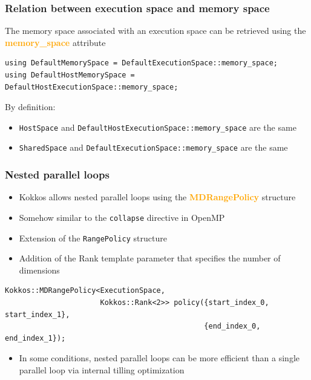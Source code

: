 \documentclass[aspectratio=169]{beamer}
\newcommand{\highlight}[1]{\textcolor{orange}{\textbf{#1}}}
\begin{document}
\begin{frame}[fragile]
    \frametitle{Relation between execution space and memory space}


The memory space associated with an execution space can be retrieved using the \highlight{memory\_space} attribute

\footnotesize
\begin{verbatim}
using DefaultMemorySpace = DefaultExecutionSpace::memory_space;
using DefaultHostMemorySpace = DefaultHostExecutionSpace::memory_space;
\end{verbatim}

\normalsize
By definition:
\begin{itemize}
    \item \texttt{HostSpace} and \texttt{DefaultHostExecutionSpace::memory\_space} are the same
    \item \texttt{SharedSpace} and \texttt{DefaultExecutionSpace::memory\_space} are the same
\end{itemize}

\end{frame}


\begin{frame}[fragile]
    \frametitle{Nested parallel loops}

\begin{itemize}
    \item Kokkos allows nested parallel loops using the \highlight{MDRangePolicy} structure
    \item Somehow similar to the \texttt{collapse} directive in OpenMP
    \item Extension of the \texttt{RangePolicy} structure
    \item Addition of the Rank template parameter that specifies the number of dimensions
\end{itemize}

\footnotesize
\begin{verbatim}
Kokkos::MDRangePolicy<ExecutionSpace, 
                      Kokkos::Rank<2>> policy({start_index_0, start_index_1}, 
                                              {end_index_0, end_index_1});
\end{verbatim}

\normalsize
\begin{itemize}
    \item In some conditions, nested parallel loops can be more efficient than a single parallel loop via internal tilling optimization
\end{itemize}

\end{frame}
\end{document}
